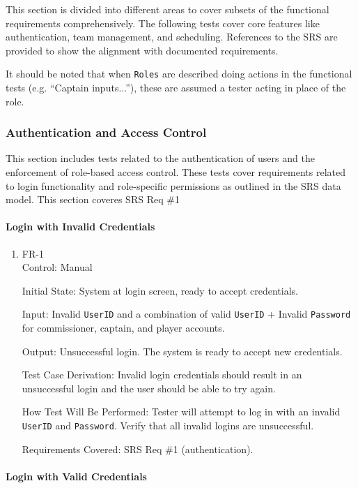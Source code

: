\documentclass[12pt, titlepage]{article}
\begin{document}
This section is divided into different areas to cover subsets of the functional requirements comprehensively. The following tests cover core features like authentication, team management, and scheduling. References to the SRS are provided to show the alignment with documented requirements.

It should be noted that when \texttt{Roles} are described doing actions in the functional tests (e.g. ``Captain inputs...''), these are assumed a tester acting in place of the role.

\subsubsection{Authentication and Access Control}

This section includes tests related to the authentication of users and the enforcement of role-based access control. These tests cover requirements related to login functionality and role-specific permissions as outlined in the SRS data model. This section coveres SRS Req \#1

\paragraph{Login with Invalid Credentials}

\begin{enumerate}
    \item{FR-1\\}
          Control: Manual

          Initial State: System at login screen, ready to accept credentials.

          Input: Invalid \texttt{UserID} and a combination of valid \texttt{UserID} + Invalid \texttt{Password} for commissioner, captain, and player accounts.

          Output: Unsuccessful login. The system is ready to accept new credentials.

          Test Case Derivation: Invalid login credentials should result in an unsuccessful login and the user should be able to try again.

          How Test Will Be Performed: Tester will attempt to log in with an invalid \texttt{UserID} and \texttt{Password}. Verify that all invalid logins are unsuccessful.

          Requirements Covered: SRS Req \#1 (authentication).
\end{enumerate}

\paragraph{Login with Valid Credentials}
\end{document}

